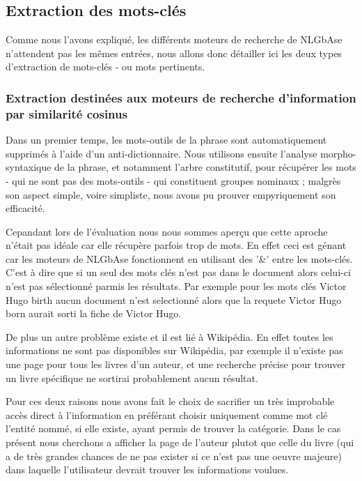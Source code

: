 \documentclass[10pt,a4paper]{article}
\begin{document}

\subsection{Extraction des mots-clés}

\par Comme nous l'avons expliqué, les différents moteurs de recherche de NLGbAse n'attendent pas les mêmes entrées, nous allons donc détailler ici les deux types d'extraction de mots-clés - ou mots pertinents.

\subsubsection{Extraction destinées aux moteurs de recherche d'information par similarité cosinus}
\par Dans un premier temps, les mots-outils de la phrase sont automatiquement supprimés à l'aide d'un anti-dictionnaire. Nous utilisons ensuite l'analyse morpho-syntaxique de la phrase, et notamment l'arbre constitutif, pour récupérer les mots - qui ne sont pas des mots-outils - qui constituent groupes nominaux ; malgrès son aspect simple, voire simpliste, nous avons pu prouver empyriquement son efficacité.
\par Cepandant lors de l'évaluation nous nous sommes aperçu que cette aproche n'était pas idéale car elle récupère parfois trop de mots. En effet ceci est génant car les moteurs de NLGbAse fonctionnent en utilisant des '\&' entre les mots-clés. C'est à dire que si un seul des mots clés n'est pas dans le document alors celui-ci n'est pas sélectionné parmis les résultats. Par exemple pour les mots clés \og{}Victor Hugo birth\fg{} aucun document n'est selectionné alors que la requete \og{}Victor Hugo born\fg{} aurait sorti la fiche de Victor Hugo.
\par De plus un autre problème existe et il est lié à Wikipédia. En effet toutes les informations ne sont pas disponibles sur Wikipédia, par exemple il n'existe pas une page pour tous les livres d'un auteur, et une recherche précise pour trouver un livre spécifique ne sortirai probablement aucun résultat.
\par Pour ces deux raisons nous avons fait le choix de sacrifier un très improbable accès direct à l'information en préférant choisir uniquement comme mot clé l'entité nommé, si elle existe, ayant permis de trouver la catégorie. Dans le cas présent nous cherchons a afficher la page de l'auteur plutot que celle du livre (qui a de très grandes chances de ne pas exister si ce n'est pas une oeuvre majeure) dans laquelle l'utilisateur devrait trouver les informations voulues. %
\end{document}
